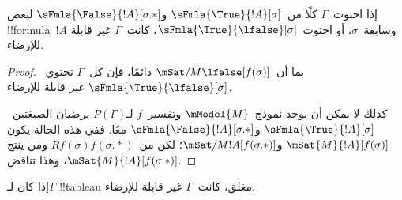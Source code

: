 \documentclass[../../../include/open-logic-section]{subfiles}
\begin{document}
\begin{prop}
  إذا احتوت~$\Gamma$ كلًا من~$\sFmla{\True}{!A}[\sigma]$
  و$\sFmla{\False}{!A}[\sigma.{*}]$ لبعض !!{formula}~$!A$
  وسابقة~$\sigma$، أو احتوت~$\sFmla{\True}{\lfalse}[\sigma]$،
  كانت~$\Gamma$ غير قابلة للإرضاء.
\end{prop}

\begin{proof}
  بما أن~$\mSat/{M}{\lfalse}[f(\sigma)]$ دائمًا، فإن كل~$\Gamma$
  تحتوي~$\sFmla{\True}{\lfalse}[\sigma]$ غير قابلة للإرضاء.

  كذلك لا يمكن أن يوجد نموذج~$\mModel{M}$ وتفسير~$f$ لـ$P(\Gamma)$
  يرضيان الصيغتين~$\sFmla{\True}{!A}[\sigma]$
  و$\sFmla{\False}{!A}[\sigma.{*}]$ معًا. ففي هذه الحالة يكون
  $\mSat{M}{!A}[f(\sigma)]$ و$\mSat/{M}{!A}[f(\sigma.{*})]$؛
  لكن من~$Rf(\sigma)f(\sigma.{*})$ ومن
   ينتج
  $\mSat{M}{!A}[f(\sigma.{*})]$، وهذا تناقض.
\end{proof}

\begin{thm}[السلامة]
  إذا كان لـ$\Gamma$ !!{tableau} مغلق، كانت~$\Gamma$ غير قابلة للإرضاء.
\end{thm}
\end{document}
